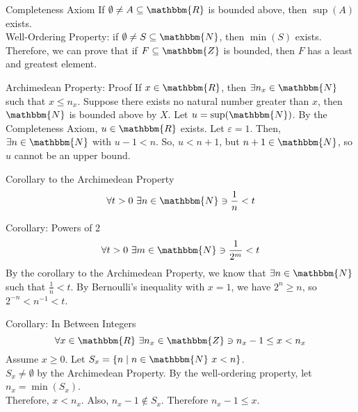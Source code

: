 \documentclass[10pt]{extarticle}
\newcommand{\N}{\mathbbm{N}}
\newcommand{\Z}{\mathbbm{Z}}
\newcommand{\R}{\mathbbm{R}}
\begin{document}
  \begin{problem}{Completeness Axiom}
    If $\emptyset\neq A\subseteq \R$ is bounded above, then $\sup(A)$ exists.\\

    Well-Ordering Property: if $\emptyset \neq S\subseteq \N$, then $\min(S)$ exists.\\

    Therefore, we can prove that if $F\subseteq \Z$ is bounded, then $F$ has a least and greatest element.\\

    \begin{problem}{Archimedean Property: Proof}
      If $x\in\R$, then $\exists n_x\in\N$ such that $x\leq n_x$.
      \tcblower
      Suppose there exists no natural number greater than $x$, then $\N$ is bounded above by $X$. Let $u = \sup(\N)$. By the Completeness Axiom, $u\in\R$ exists. Let $\varepsilon = 1$. Then, $\exists n\in\N$ with $u-1 < n$. So, $u < n+1$, but $n+1\in\N$, so $u$ cannot be an upper bound.
    \end{problem}
    \begin{problem}{Corollary to the Archimedean Property}
      \[
        \forall t > 0~\exists n\in\N \ni \frac{1}{n}<t
      \] 
    \end{problem}
    \begin{problem}{Corollary: Powers of 2}
      \[
        \forall t > 0~\exists m\in\N \ni \frac{1}{2^m} < t
      \] 
      \tcblower
      By the corollary to the Archimedean Property, we know that $\exists n\in \N$ such that $\frac{1}{n} < t$. By Bernoulli's inequality with $x = 1$, we have $2^n \geq n$, so $2^{-n} < n^{-1} < t$.
    \end{problem}
    \begin{problem}{Corollary: In Between Integers}
      \[
        \forall x\in\R~\exists n_x\in \Z \ni n_x-1 \leq x < n_x
      \] 
      \tcblower
      Assume $x \geq 0$. Let $S_x = \{n\mid n\in \N~x < n\}$.\\

      $S_x \neq \emptyset$ by the Archimedean Property. By the well-ordering property, let $n_x = \min(S_x)$.\\

      Therefore, $x < n_x$. Also, $n_x - 1 \notin S_x$. Therefore $n_x - 1 \leq x$.
    \end{problem}
  \end{problem}
\end{document}
